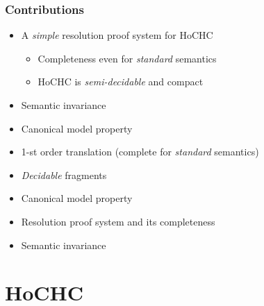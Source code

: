 \documentclass{beamer}
\begin{document}
\begin{frame}
  \frametitle{Contributions}
  \begin{itemize}
  \item A \emph{simple} resolution proof system for HoCHC
    \begin{itemize}
    \item Completeness even for \emph{standard} semantics
    \item HoCHC is \emph{semi-decidable} and compact
    \end{itemize}
  \item Semantic invariance
  \item Canonical model property
  \item 1-st order translation (complete for \emph{standard}
    semantics)
  \item \emph{Decidable} fragments
  \end{itemize}

  \begin{itemize}
  \item Canonical model property 
  \item Resolution proof system and its completeness
  \item Semantic invariance
  \end{itemize}
\end{frame}

\section{HoCHC}
\end{document}
